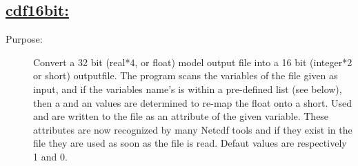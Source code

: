 \documentclass[a4paper,11pt]{article}
\begin{document}
\newpage
\subsection*{\underline{cdf16bit:}}
\begin{description}
\item[Purpose:] Convert a 32 bit (real*4, or float) model output file into a 16 bit (integer*2 or short) outputfile. The program scans
   the variables of the file given as input, and if the variables name's is within a pre-defined list (see below), then a \SF and
   an \ao values are determined to re-map the float onto a short. Used \SF and \ao are written to the file as
   an attribute of the given variable. These attributes are now recognized by many Netcdf tools and if they exist in the file they are
   used as soon as the file is read. Defaut values are respectively 1 and 0. 


\end{description}
\end{document}
